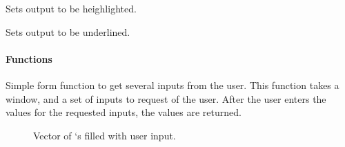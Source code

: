 \documentclass[letterpaper,10pt,english]{sphinxmanual}
\begin{document}
\begin{fulllineitems}
\begin{fulllineitems}
\begin{fulllineitems}
\end{fulllineitems}


\begin{fulllineitems}
\label{\detokenize{index:_CPPv2N7ostendo8STANDOUTE}}%
\pysigstartmultiline
{}%
\pysigstopmultiline
Sets output to be heighlighted. 

\end{fulllineitems}


\begin{fulllineitems}
\label{\detokenize{index:_CPPv2N7ostendo9UNDERLINEE}}%
\pysigstartmultiline
{}%
\pysigstopmultiline
Sets output to be underlined. 

\end{fulllineitems}


\end{fulllineitems}

\paragraph{Functions}

\begin{fulllineitems}
\label{\detokenize{index:_CPPv2N7ostendo4FormEN7ostendo6WindowENSt6vectorI3VarEE}}%
\pysigstartmultiline
{}\label{\detokenize{index:Pessumnamespaceostendo_1a6de3757551a0461ef565d035547e4408}}%
\pysigstopmultiline
Simple form function to get several inputs from the user. This function takes a window, and a set of inputs to request of the user. After the user enters the values for the requested inputs, the values are returned. \begin{description}
\item[{}] \leavevmode
Vector of {\hyperref[\detokenize{index:Pessumstructostendo_1_1Var}]{}}`s filled with user input. 


\end{description}
\end{fulllineitems}
\end{fulllineitems}
\end{document}

